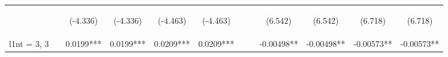 \documentclass[]{article}
\begin{document}
\begin{center}
\begin{tabular}{lccccccccccc}
        \vspace{4pt}     & \begin{footnotesize}\end{footnotesize}         & \begin{footnotesize}(-4.336)\end{footnotesize} & \begin{footnotesize}(-4.336)\end{footnotesize} & \begin{footnotesize}(-4.463)\end{footnotesize} & \begin{footnotesize}(-4.463)\end{footnotesize} & \begin{footnotesize}\end{footnotesize}          & \begin{footnotesize}\end{footnotesize}          & \begin{footnotesize}(6.542)\end{footnotesize}  & \begin{footnotesize}(6.542)\end{footnotesize}  & \begin{footnotesize}(6.718)\end{footnotesize}  & \begin{footnotesize}(6.718)\end{footnotesize}  \\
        l1nt = 3, 3      &                                                & 0.0199***                                      & 0.0199***                                      & 0.0209***                                      & 0.0209***                                      &                                                 &                                                 & -0.00498**                                     & -0.00498**                                     & -0.00573**                                     & -0.00573**                                     \\

\end{tabular}
\end{center}
\end{document}
